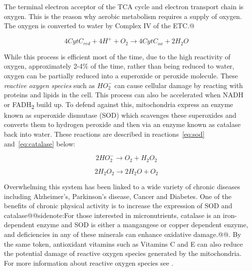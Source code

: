 \documentclass{tufte-handout}
\makeatletter
\def\sidenote#1{@@sidenote:#1@@}
\makeatother
\begin{document}
The terminal electron acceptor of the TCA cycle and electron transport chain is oxygen.  This is the reason why aerobic metabolism requires a supply of oxygen.  The oxygen is converted to water by Complex IV of the ETC.@  

\begin{equation}\label{eq:civ}
4 CytC_{red} + 4H^+ + O_2 \rightarrow 4 CytC_{ox} + 2 H_2O 
\end{equation}

While this process is efficient most of the time, due to the high reactivity of oxygen, approximately 2-4\% of the time, rather than being reduced to water, oxygen can be partially reduced into a superoxide or peroxide molecule.  These \emph{reactive oxygen species} such as $HO_2^-$ can cause cellular damage by reacting with proteins and lipids in the cell.  This process can also be accelerated when NADH or FADH\textsubscript{2} build up.  To defend against this, mitochondria express an enzyme known as superoxide dismutase (SOD) which scavenges these superoxides and converts them to hydrogen peroxide and then via an enzyme known as catalase back into water.  These reactions are described in reactions~\ref{eq:sod} and~\ref{eq:catalase} below:

\begin{equation}\label{eq:sod}
2 HO_2^- \rightarrow O_2 + H_2O_2
\end{equation}

\begin{equation}\label{eq:catalase}
2 H_2O_2 \rightarrow 2 H_2O + O_2
\end{equation}


Overwhelming this system has been linked to a wide variety of chronic diseases including Alzheimer's, Parkinson's disease, Cancer and Diabetes.  One of the benefits of chronic physical activity is to increase the expression of SOD and catalase\sidenote{For those interested in micronutrients, catalase is an iron-dependent enzyme and SOD is either a mangangese or copper dependent enzyme, and deficiencies in any of these minerals can enhance oxidative damage.}.  By the same token, antioxidant vitamins such as Vitamins C and E can also reduce the potential damage of reactive oxygen species generated by the mitochondria.  For more information about reactive oxygen species see \citet{Turrens2003}.


\end{document}
